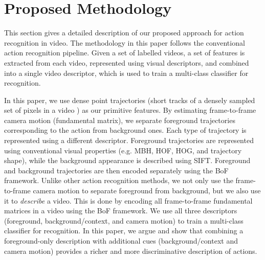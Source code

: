 \section{Proposed Methodology} \label{scene}
This section gives a detailed description of our proposed approach for action recognition in video. The methodology in this paper follows the conventional action recognition pipeline. Given a set of labelled videos, a set of features is extracted from each video, represented using visual descriptors, and combined into a single video descriptor, which is used to train a multi-class classifier for recognition. 

In this paper, we use dense point trajectories (short tracks of a densely sampled set of pixels in a video \cite{wang2013}) as our primitive features. By estimating frame-to-frame camera motion (fundamental matrix), we separate foreground trajectories corresponding to the action from background ones. Each type of trajectory is represented using a different descriptor. Foreground trajectories are represented using conventional visual properties (e.g. MBH, HOF, HOG, and trajectory shape), while the background appearance is described using SIFT. Foreground and background trajectories are then encoded separately using the BoF framework. Unlike other action recognition methods, we not only use the frame-to-frame camera motion to separate foreground from background, but we also use it to \emph{describe} a video. This is done by encoding all frame-to-frame fundamental matrices in a video using the BoF framework. We use all three descriptors (foreground, background/context, and camera motion) to train a multi-class classifier for recognition.  In this paper, we argue and show that combining a foreground-only description \cite{wang2013} with additional cues (background/context and camera motion) provides a richer and more discriminative description of actions.



